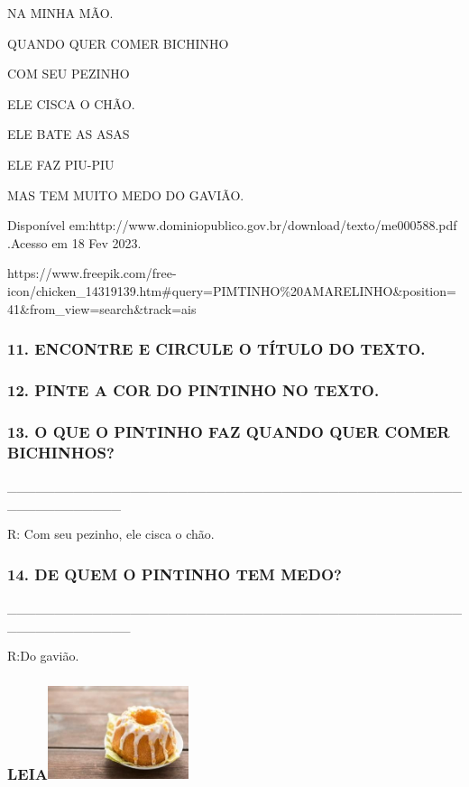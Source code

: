 NA MINHA MÃO.

QUANDO QUER COMER BICHINHO

\protect\hypertarget{_heading=h.2jxsxqh}{}{}COM SEU PEZINHO

ELE CISCA O CHÃO.

ELE BATE AS ASAS

ELE FAZ PIU-PIU

MAS TEM MUITO MEDO DO GAVIÃO.

Disponível
em:http://www.dominiopublico.gov.br/download/texto/me000588.pdf .Acesso
em 18 Fev 2023.

https://www.freepik.com/free-icon/chicken\_14319139.htm\#query=PIMTINHO\%20AMARELINHO\&position=41\&from\_view=search\&track=ais

\subsubsection{11. ENCONTRE E CIRCULE O TÍTULO DO
TEXTO.}\label{encontre-e-circule-o-tuxedtulo-do-texto.}

\subsubsection{12. PINTE A COR DO PINTINHO NO
TEXTO.}\label{pinte-a-cor-do-pintinho-no-texto.}

\subsubsection{13. O QUE O PINTINHO FAZ QUANDO QUER COMER
BICHINHOS?}\label{o-que-o-pintinho-faz-quando-quer-comer-bichinhos}

\_\_\_\_\_\_\_\_\_\_\_\_\_\_\_\_\_\_\_\_\_\_\_\_\_\_\_\_\_\_\_\_\_\_\_\_\_\_\_\_\_\_\_\_\_\_\_\_\_\_\_\_\_\_\_\_\_\_\_\_

R: Com seu pezinho, ele cisca o chão.

\subsubsection{14. DE QUEM O PINTINHO TEM
MEDO?}\label{de-quem-o-pintinho-tem-medo}

\_\_\_\_\_\_\_\_\_\_\_\_\_\_\_\_\_\_\_\_\_\_\_\_\_\_\_\_\_\_\_\_\_\_\_\_\_\_\_\_\_\_\_\_\_\_\_\_\_\_\_\_\_\_\_\_\_\_\_\_\_

R:Do gavião.

\subsubsection[LEIA]{\texorpdfstring{LEIA\protect\includegraphics[width=1.61944in,height=1.07917in]{media/image130.jpg}}{LEIA}}\label{leia-1}

